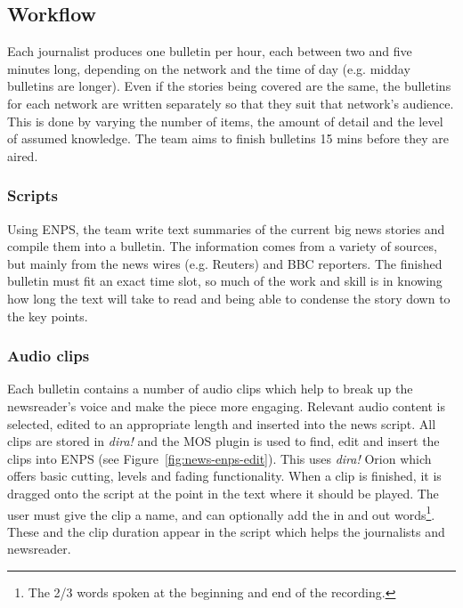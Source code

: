 \subsection{Workflow}
Each journalist produces one bulletin per hour, each between two and five
minutes long, depending on the network and the time of day (e.g. midday
bulletins are longer). Even if the stories being covered are the same, the
bulletins for each network are written separately so that they suit that
network's audience. This is done by varying the number of items, the amount of
detail and the level of assumed knowledge. The team aims to finish bulletins 15
mins before they are aired.

\subsubsection{Scripts}
Using ENPS, the team write text summaries of the current big news stories and
compile them into a bulletin. The information comes from a variety of sources,
but mainly from the news wires (e.g. Reuters) and BBC reporters.  The finished
bulletin must fit an exact time slot, so much of the work and skill is in
knowing how long the text will take to read and being able to condense the
story down to the key points. 

\subsubsection{Audio clips}\label{sec:news-clips}
Each bulletin contains a number of audio clips which help to break up the
newsreader's voice and make the piece more engaging.  Relevant audio content is
selected, edited to an appropriate length and inserted into the news script.
All clips are stored in \textit{dira!} and the MOS plugin is used to find, edit
and insert the clips into ENPS (see Figure~\ref{fig:news-enps-edit}).  This
uses \textit{dira!} Orion which offers basic cutting, levels and fading
functionality. When a clip is finished, it is dragged onto the script at the
point in the text where it should be played. The user must give the clip a
name, and can optionally add the in and out words\footnote{The 2/3 words spoken
  at the beginning and end of the recording.}. These and the clip duration
appear in the script which helps the journalists and newsreader.

